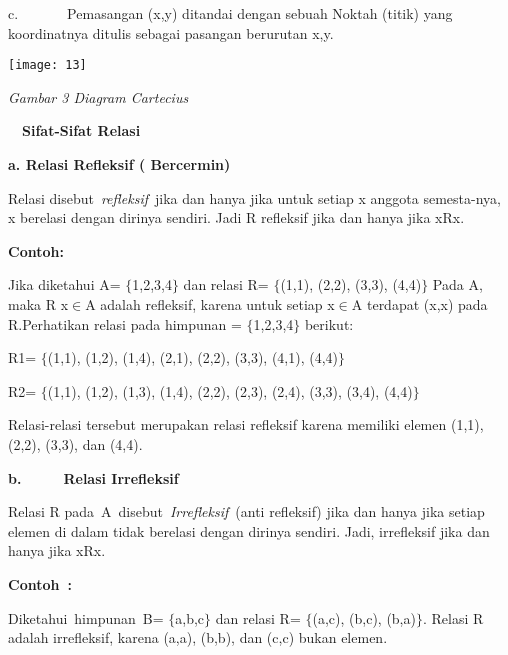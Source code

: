 \documentclass[11pt,fleqn]{book} %
\begin{document}
\noindent c.~~~~~~~Pemasangan (x,y) ditandai dengan sebuah Noktah (titik) yang koordinatnya ditulis sebagai pasangan berurutan x,y.

\begin{center}
\noindent \texttt{[image: 13]}
\end{center}

\noindent \textit{Gambar 3 Diagram Cartecius}

\noindent 

\noindent 

 ~~\textbf{Sifat-Sifat Relasi}

\textbf{a. Relasi Refleksif ( Bercermin)}

\textbf{}

Relasi disebut~\textit{refleksif}~jika dan hanya jika untuk setiap x anggota semesta-nya, x berelasi dengan dirinya sendiri. Jadi R refleksif jika dan hanya jika xRx.

\textbf{}

\textbf{Contoh:}



\noindent Jika diketahui A= $\{$1,2,3,4$\}$ dan relasi R= $\{$(1,1), (2,2), (3,3), (4,4)$\}$ Pada A, maka R x$\mathrm{\in }$A adalah refleksif, karena untuk setiap x$\mathrm{\in }$A terdapat (x,x) pada R.Perhatikan relasi pada himpunan = $\{$1,2,3,4$\}$ berikut:



R1= $\{$(1,1), (1,2), (1,4), (2,1), (2,2), (3,3), (4,1), (4,4)$\}$

R2= $\{$(1,1), (1,2), (1,3), (1,4), (2,2), (2,3), (2,4), (3,3), (3,4), (4,4)$\}$



\noindent Relasi-relasi tersebut merupakan relasi refleksif karena memiliki elemen (1,1), (2,2), (3,3), dan (4,4).



\textbf{b.}~~~~~~\textbf{Relasi Irrefleksif}

\textbf{}

Relasi R pada~A~disebut~\textit{Irrefleksif}~(anti refleksif) jika dan hanya jika setiap elemen di dalam tidak berelasi dengan dirinya sendiri. Jadi, irrefleksif jika dan hanya jika xRx.

\textbf{Contoh~:}

\noindent 

\noindent Diketahui~himpunan~B= $\{$a,b,c$\}$ dan relasi R= $\{$(a,c), (b,c), (b,a)$\}$. Relasi R adalah irrefleksif, karena (a,a), (b,b), dan (c,c) bukan elemen.
\end{document}
